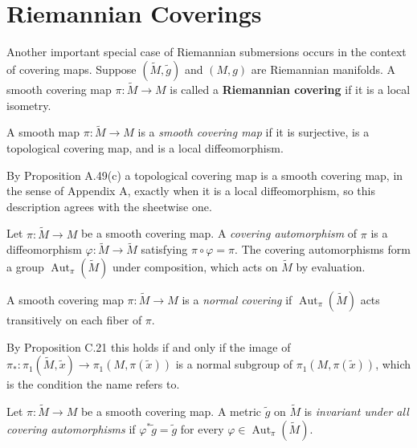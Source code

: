 \section{Riemannian Coverings}

Another important special case of Riemannian submersions occurs in the context of covering maps. Suppose $(\tilde{M}, \tilde{g})$ and $(M, g)$ are Riemannian manifolds. A smooth covering map $\pi: \tilde{M} \to M$ is called a \textbf{Riemannian covering} if it is a local isometry.

\begin{definition}
\label{def:smooth-covering-map}
\leanok
{}
A smooth map $\pi: \tilde{M} \to M$ is a \emph{smooth covering map} if it is surjective, is a topological covering map, and is a local diffeomorphism.

By Proposition A.49(c) a topological covering map is a smooth covering map, in the sense of Appendix A, exactly when it is a local diffeomorphism, so this description agrees with the sheetwise one.
\end{definition}

\begin{definition}
\label{def:covering-automorphism-group}
\leanok
{}
Let $\pi: \tilde{M} \to M$ be a smooth covering map. A \emph{covering automorphism} of $\pi$ is a diffeomorphism $\varphi: \tilde{M} \to \tilde{M}$ satisfying $\pi \circ \varphi = \pi$. The covering automorphisms form a group $\operatorname{Aut}_\pi(\tilde{M})$ under composition, which acts on $\tilde{M}$ by evaluation.
\end{definition}

\begin{definition}
\label{def:normal-covering-fibre-transitive}
\leanok
{}
A smooth covering map $\pi: \tilde{M} \to M$ is a \emph{normal covering} if $\operatorname{Aut}_\pi(\tilde{M})$ acts transitively on each fiber of $\pi$.

By Proposition C.21 this holds if and only if the image of $\pi_*: \pi_1(\tilde{M}, \tilde{x}) \to \pi_1(M, \pi(\tilde{x}))$ is a normal subgroup of $\pi_1(M, \pi(\tilde{x}))$, which is the condition the name refers to.
\end{definition}

\begin{definition}
\label{def:covering-automorphism-invariant-metric}
\leanok
{}
Let $\pi: \tilde{M} \to M$ be a smooth covering map. A metric $\tilde{g}$ on $\tilde{M}$ is \emph{invariant under all covering automorphisms} if $\varphi^*\tilde{g} = \tilde{g}$ for every $\varphi \in \operatorname{Aut}_\pi(\tilde{M})$.
\end{definition}

